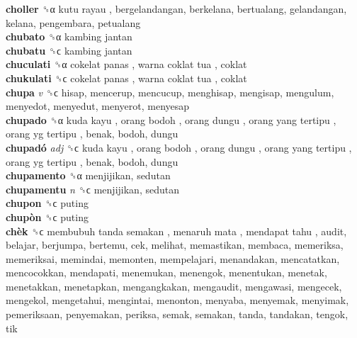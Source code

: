 \textbf{choller} ␝α   kutu rayau , bergelandangan, berkelana, bertualang, gelandangan, kelana, pengembara, petualang  \\
\textbf{chubato} ␝α   kambing jantan   \\
\textbf{chubatu} ␝ϲ   kambing jantan   \\
\textbf{chuculati} ␝α   cokelat panas ,  warna coklat tua , coklat  \\
\textbf{chukulati} ␝ϲ   cokelat panas ,  warna coklat tua , coklat  \\
\textbf{chupa} \emph{v}  ␝ϲ  hisap, mencerup, mencucup, menghisap, mengisap, mengulum, menyedot, menyedut, menyerot, menyesap  \\
\textbf{chupado} ␝α   kuda kayu ,  orang bodoh ,  orang dungu ,  orang yang tertipu ,  orang yg tertipu , benak, bodoh, dungu  \\
\textbf{chupadó} \emph{adj}  ␝ϲ   kuda kayu ,  orang bodoh ,  orang dungu ,  orang yang tertipu ,  orang yg tertipu , benak, bodoh, dungu  \\
\textbf{chupamento} ␝α  menjijikan, sedutan  \\
\textbf{chupamentu} \emph{n}  ␝ϲ  menjijikan, sedutan  \\
\textbf{chupon} ␝ϲ  puting  \\
\textbf{chupòn} ␝ϲ  puting  \\
\textbf{chèk} ␝ϲ   membubuh tanda semakan ,  menaruh mata ,  mendapat tahu , audit, belajar, berjumpa, bertemu, cek, melihat, memastikan, membaca, memeriksa, memeriksai, memindai, memonten, mempelajari, menandakan, mencatatkan, mencocokkan, mendapati, menemukan, menengok, menentukan, menetak, menetakkan, menetapkan, mengangkakan, mengaudit, mengawasi, mengecek, mengekol, mengetahui, mengintai, menonton, menyaba, menyemak, menyimak, pemeriksaan, penyemakan, periksa, semak, semakan, tanda, tandakan, tengok, tik  \\
